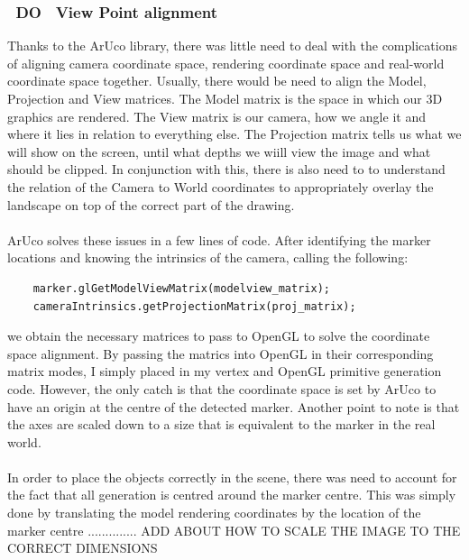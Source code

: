 \documentclass[11pt]{article}
\begin{document}
\subsubsection{~DO~ View Point alignment}
Thanks to the ArUco library, there was little need to deal with the
complications of aligning camera coordinate space, rendering coordinate space
and real-world coordinate space together. Usually, there would be
need to align the Model, Projection and View matrices. The Model matrix
is the space in which our 3D graphics are rendered. The View matrix is
our camera, how we angle it and where it lies in relation to everything
else. The Projection matrix tells us what we will show on the screen,
until what depths we wiill view the image and what should be clipped.
In conjunction with this, there is also need to
to understand the relation of the Camera to World coordinates to appropriately
overlay the landscape on top of the correct part of the drawing.\\
\\
ArUco solves these issues in a few lines of code. 
After identifying the marker
locations and knowing the intrinsics of the camera, calling the following:
\begin{lstlisting}
	marker.glGetModelViewMatrix(modelview_matrix);
	cameraIntrinsics.getProjectionMatrix(proj_matrix);
\end{lstlisting} 

we obtain
the necessary matrices to pass to OpenGL to solve the coordinate space
alignment. By passing the matrics into OpenGL in their corresponding
matrix modes, I simply placed in my vertex and OpenGL primitive generation code.
However, the only catch is that the coordinate space is set by ArUco to have
an origin at the centre of the detected marker. Another point to note is
that the axes are scaled down to a size that is equivalent 
to the marker in the real world.\\
\\
In order to place the objects correctly in the scene, there was need to 
account for the fact that all generation is centred around the marker centre.
This was simply done by translating the model rendering coordinates by the
location of the marker centre
.............. ADD ABOUT HOW TO SCALE THE IMAGE TO THE CORRECT DIMENSIONS
\end{document}
